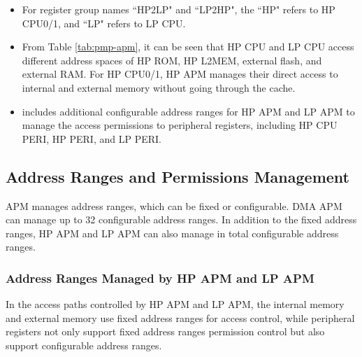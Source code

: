 \documentclass[main\_\_EN.tex]{subfiles}
\begin{document}
\begin{tiplisting}
\vspace{-2em}
\begin{itemize}
    \item For register group names ``HP2LP" and ``LP2HP", the ``HP" refers to HP CPU0/1, and ``LP" refers to LP CPU.
    \item From Table \ref{tab:pmp-apm}, it can be seen that HP CPU and LP CPU access different address spaces of HP ROM, HP L2MEM, external flash, and external RAM. For HP CPU0/1, HP APM manages their direct access to internal and external memory without going through the cache.
    \item {} includes  additional configurable address ranges for HP APM and LP APM to manage the access permissions to peripheral registers, including HP CPU PERI, HP PERI, and LP PERI.
\end{itemize}
\end{tiplisting}

\subsection{Address Ranges and Permissions Management}\label{sec:permctrl-addr-region}

APM manages address ranges, which can be fixed or configurable. DMA APM can manage up to 32 configurable address ranges. In addition to the fixed address ranges, HP APM and LP APM can also manage in total  configurable address ranges.

\subsubsection{Address Ranges Managed by HP APM and LP APM}

In the access paths controlled by HP APM and LP APM, the internal memory and external memory use fixed address ranges for access control, while peripheral registers not only support fixed address ranges permission control but also support  configurable address ranges.
\end{document}
